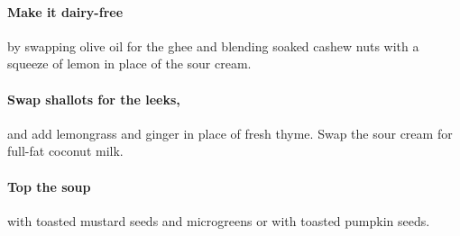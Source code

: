 \paragraph{Make it dairy-free} by swapping olive oil for the ghee and blending soaked cashew nuts with a squeeze of lemon in place of the sour cream. 
\paragraph{Swap shallots for the leeks,} and add lemongrass and ginger in place of fresh thyme. Swap the sour cream for full-fat coconut milk. 
\paragraph{Top the soup} with toasted mustard seeds and microgreens or with toasted pumpkin seeds. 


